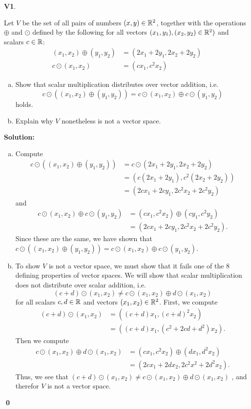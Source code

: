 \documentclass{article}
\newenvironment{problem}[1]
{
  \begin{flushleft}
  \textbf{#1}.
  \ignorespaces
}
{
  \end{flushleft}
}
\newenvironment{solution}
{
  \ignorespaces
  \textbf{Solution:}
}
{
  \ignorespacesafterend
  \begin{flushright}
  {\bfseries \qed}
  \end{flushright}
}
\begin{document}
\begin{problem}{V1}
Let \(V\) be the set of all pairs of numbers \((x,y)\in \mathbb{R}^2\), together with the operations
\(\oplus\) and \(\odot\) defined by the following for all vectors \((x_1,y_1), (x_2,y_2) \in \mathbb{R}^2)\) and scalars \(c \in \mathbb{R}\):
\begin{align*}
(x_1,x_2) \oplus (y_1,y_2) &= (2x_1+2y_1,2x_2+2y_2) \\
c\odot (x_1,x_2) &= (cx_1,c^2x_2)
\end{align*}
\begin{enumerate}[(a)]
\item Show that scalar multiplication distributes over vector addition, i.e. 
\[c\odot \left((x_1,x_2) \oplus (y_1,y_2) \right) = c \odot (x_1,x_2) \oplus c \odot (y_1,y_2)\]
holds.
\item Explain why \(V\) nonetheless is not a vector space.
\end{enumerate}
\end{problem}
\begin{solution}
\begin{enumerate}[(a)]
\item
Compute
\begin{align*}
  c \odot \left((x_1,x_2) \oplus (y_1,y_2) \right)
  &= c \odot (2x_1+2y_1,2x_2+2y_2) \\
  &= (c(2x_1+2y_1),c^2(2x_2+2y_2)) \\
  &= (2cx_1+2cy_1,2c^2x_2+2c^2y_2)
\end{align*}
and
\begin{align*}
  c\odot (x_1,x_2) \oplus c \odot (y_1,y_2) 
  &= (cx_1,c^2x_2) \oplus (cy_1,c^2y_2)\\
  &= (2cx_1+2cy_1,2c^2x_2+2c^2y_2).
\end{align*}
Since these are the same, we have shown that
\(c\odot \left((x_1,x_2) \oplus (y_1,y_2) \right) = c \odot (x_1,x_2) \oplus c \odot (y_1,y_2)\).
\item

To show \(V\) is not a vector space, we must show that it fails one of the 8 defining properties of vector spaces. We will show that scalar multiplication does not distribute over scalar addition, i.e.
\[ (c+d)\odot(x_1,x_2) \neq c \odot(x_1,x_2) \oplus d\odot(x_1,x_2) \]
for all scalars \(c,d \in \mathbb{R}\) and vectors \((x_1,x_2)\in \mathbb{R}^2\).
First, we compute
\begin{align*}
(c+d)\odot(x_1,x_2) &= ((c+d)x_1,(c+d)^2x_2) \\
&= ( (c+d)x_1, (c^2+2cd+d^2)x_2).
\end{align*}
Then we compute
\begin{align*}
c\odot (x_1,x_2) \oplus d\odot(x_1,x_2) &= (cx_1,c^2x_2) \oplus (dx_1,d^2x_2) \\
&= ( 2cx_1+2dx_2, 2c^2x^2+2d^2x_2).
\end{align*}
Thus, we see that 
\( (c+d)\odot(x_1,x_2) \neq c \odot(x_1,x_2) \oplus d\odot(x_1,x_2) \)
, and therefor \(V\) is not a vector space.
\end{enumerate}
\end{solution}
\end{document}
